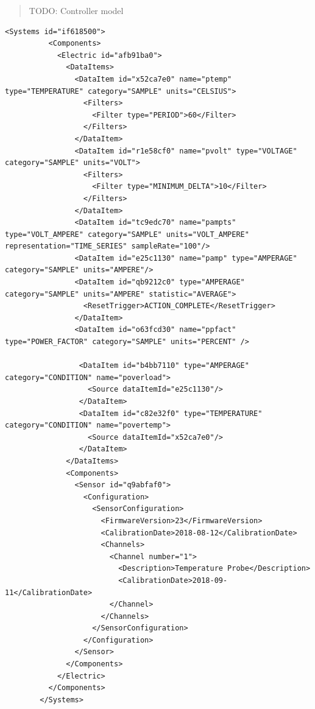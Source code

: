 \begin{quote}
    \color{red} TODO: Controller model
\end{quote}

\begin{lstlisting}[firstnumber=last,%
    caption={Electrical System and Sensor Configuration},label={lst:electric-system-example-1}]
        <Systems id="if618500">
          <Components>
            <Electric id="afb91ba0">
              <DataItems>
                <DataItem id="x52ca7e0" name="ptemp" type="TEMPERATURE" category="SAMPLE" units="CELSIUS">
                  <Filters>
                    <Filter type="PERIOD">60</Filter>
                  </Filters>
                </DataItem>
                <DataItem id="r1e58cf0" name="pvolt" type="VOLTAGE" category="SAMPLE" units="VOLT">
                  <Filters>
                    <Filter type="MINIMUM_DELTA">10</Filter>
                  </Filters>
                </DataItem>
                <DataItem id="tc9edc70" name="pampts" type="VOLT_AMPERE" category="SAMPLE" units="VOLT_AMPERE" representation="TIME_SERIES" sampleRate="100"/>
                <DataItem id="e25c1130" name="pamp" type="AMPERAGE" category="SAMPLE" units="AMPERE"/>
                <DataItem id="qb9212c0" type="AMPERAGE" category="SAMPLE" units="AMPERE" statistic="AVERAGE">
                  <ResetTrigger>ACTION_COMPLETE</ResetTrigger>
                </DataItem>
                <DataItem id="o63fcd30" name="ppfact" type="POWER_FACTOR" category="SAMPLE" units="PERCENT" />
                
                 <DataItem id="b4bb7110" type="AMPERAGE" category="CONDITION" name="poverload">
                   <Source dataItemId="e25c1130"/>
                 </DataItem>
                 <DataItem id="c82e32f0" type="TEMPERATURE" category="CONDITION" name="povertemp">
                   <Source dataItemId="x52ca7e0"/>
                 </DataItem>
              </DataItems>
              <Components>
                <Sensor id="q9abfaf0">
                  <Configuration>
                    <SensorConfiguration>
                      <FirmwareVersion>23</FirmwareVersion>
                      <CalibrationDate>2018-08-12</CalibrationDate>
                      <Channels>
                        <Channel number="1">
                          <Description>Temperature Probe</Description>
                          <CalibrationDate>2018-09-11</CalibrationDate>
                        </Channel>
                      </Channels>
                    </SensorConfiguration>
                  </Configuration>
                </Sensor>              
              </Components>
            </Electric>
          </Components>
        </Systems>
\end{lstlisting}

